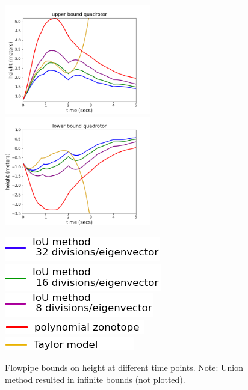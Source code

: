 %
\begin{figure}
\includegraphics[width=6.4cm,height=4.8cm]{quadrotorImages/ubToolHeight.png}%
\includegraphics[width=6.4cm,height=4.8cm]{quadrotorImages/lbToolHeight.png}

\includegraphics[scale = 0.41]{quadrotorImages/leg1.png}~
  \includegraphics[scale = 0.41]{quadrotorImages/leg2.png}~
  \includegraphics[scale = 0.41]{quadrotorImages/leg3.png}
\includegraphics[scale = 0.41]{quadrotorImages/leg5.png}~
  \includegraphics[scale = 0.41]{quadrotorImages/leg4.png}
\caption{Flowpipe bounds on height at different time points.
Note: Union method resulted in infinite bounds (not plotted).}\label{fig:flowquadrotor}
\end{figure}
% 

